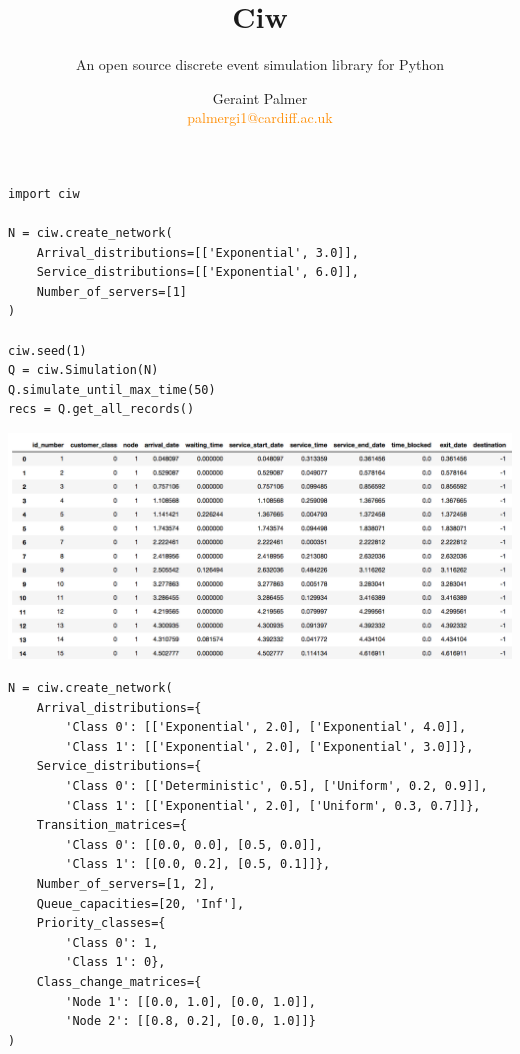 \documentclass{beamer}
\title{Ciw}
\subtitle{An open source discrete event simulation library for Python}
\author{Geraint Palmer\\\textcolor{darkorange}{palmergi1@cardiff.ac.uk}}
\date{}
\begin{document}
\frame{\titlepage}

\begin{frame}
  \begin{center}
    
  \end{center}
\end{frame}

\begin{frame}[fragile]
\begin{center}
\begin{verbatim}
import ciw

N = ciw.create_network(
    Arrival_distributions=[['Exponential', 3.0]],
    Service_distributions=[['Exponential', 6.0]],
    Number_of_servers=[1]
)

ciw.seed(1)
Q = ciw.Simulation(N)
Q.simulate_until_max_time(50)
recs = Q.get_all_records()
\end{verbatim}
\end{center}
\end{frame}

\begin{frame}
\includegraphics[width=\textwidth]{ciwrecords}
\end{frame}

\begin{frame}[fragile]
\begin{verbatim}
N = ciw.create_network(
    Arrival_distributions={
        'Class 0': [['Exponential', 2.0], ['Exponential', 4.0]],
        'Class 1': [['Exponential', 2.0], ['Exponential', 3.0]]},
    Service_distributions={
        'Class 0': [['Deterministic', 0.5], ['Uniform', 0.2, 0.9]],
        'Class 1': [['Exponential', 2.0], ['Uniform', 0.3, 0.7]]},
    Transition_matrices={
        'Class 0': [[0.0, 0.0], [0.5, 0.0]],
        'Class 1': [[0.0, 0.2], [0.5, 0.1]]},
    Number_of_servers=[1, 2],
    Queue_capacities=[20, 'Inf'],
    Priority_classes={
        'Class 0': 1,
        'Class 1': 0},
    Class_change_matrices={
        'Node 1': [[0.0, 1.0], [0.0, 1.0]],
        'Node 2': [[0.8, 0.2], [0.0, 1.0]]}
)
\end{verbatim}
\end{frame}
\end{document}
